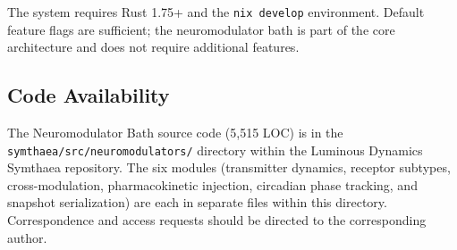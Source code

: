 \documentclass[11pt,a4paper]{article}
\begin{document}
The system requires Rust 1.75+ and the \texttt{nix develop} environment. Default feature flags are sufficient; the neuromodulator bath is part of the core architecture and does not require additional features.

\subsection*{Code Availability}

The Neuromodulator Bath source code (5,515 LOC) is in the \texttt{symthaea/src/neuromodulators/} directory within the Luminous Dynamics Symthaea repository. The six modules (transmitter dynamics, receptor subtypes, cross-modulation, pharmacokinetic injection, circadian phase tracking, and snapshot serialization) are each in separate files within this directory. Correspondence and access requests should be directed to the corresponding author.
\end{document}
